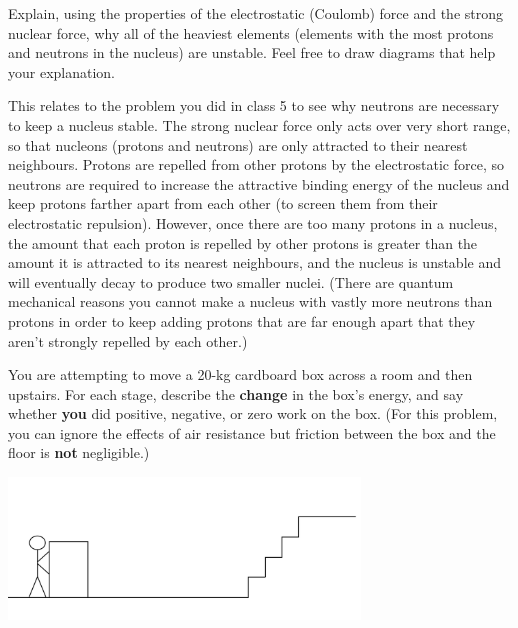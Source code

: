 \documentclass[12pt]{exam}
\begin{document}
\begin{questions}

\question Explain, using the properties of the electrostatic (Coulomb) force and the strong nuclear force, why all of the heaviest elements (elements with the most protons and neutrons in the nucleus) are unstable. Feel free to draw diagrams that help your explanation.
\begin{TheSolution}
This relates to the problem you did in class 5 to see why neutrons are necessary to keep a nucleus stable. The strong nuclear force only acts over very short range, so that nucleons (protons and neutrons) are only attracted to their nearest neighbours. Protons are repelled from other protons by the electrostatic force, so neutrons are required to increase the attractive binding energy of the nucleus and keep protons farther apart from each other (to screen them from their electrostatic repulsion). However, once there are too many protons in a nucleus, the amount that each proton is repelled by other protons is greater than the amount it is attracted to its nearest neighbours, and the nucleus is unstable and will eventually decay to produce two smaller nuclei. (There are quantum mechanical reasons you cannot make a nucleus with vastly more neutrons than protons in order to keep adding protons that are far enough apart that they aren't strongly repelled by each other.)
\end{TheSolution}

\question You are attempting to move a 20-kg cardboard box across a room and then upstairs. For each stage, describe the \textbf{change} in the box's energy, and say whether \textbf{you} did positive, negative, or zero work on the box. (For this problem, you can ignore the effects of air resistance but friction between the box and the floor is \textbf{not} negligible.)
\begin{center}
	\includegraphics[width=0.7\textwidth]{../images/test2_stairs.png}
	\end{center}
\begin{parts}

\end{parts}
\end{questions}
\end{document}
